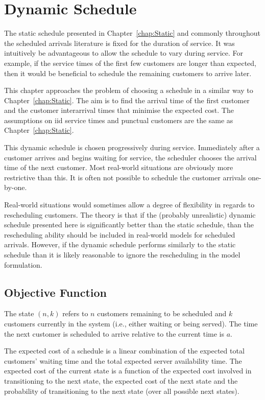 \chapter{Dynamic Schedule}
The static schedule presented in Chapter~\ref{chap:Static} and commonly throughout the scheduled arrivals literature is fixed for the duration of service. It was intuitively be advantageous to allow the schedule to vary during service. For example, if the service times of the first few customers are longer than expected, then it would be beneficial to schedule the remaining customers to arrive later.

This chapter approaches the problem of choosing a schedule in a similar way to Chapter~\ref{chap:Static}. The aim is to find the arrival time of the first customer and the customer interarrival times that minimise the expected cost. The assumptions on iid service times and punctual customers are the same as Chapter~\ref{chap:Static}.

This dynamic schedule is chosen progressively during service. Immediately after a customer arrives and begins waiting for service, the scheduler chooses the arrival time of the next customer. Most real-world situations are obviously more restrictive than this. It is often not possible to schedule the customer arrivals one-by-one.

Real-world situations would sometimes allow a degree of flexibility in regards to rescheduling customers. The theory is that if the (probably unrealistic) dynamic schedule presented here is significantly better than the static schedule, than the rescheduling ability should be included in real-world models for scheduled arrivals. However, if the dynamic schedule performs similarly to the static schedule than it is likely reasonable to ignore the rescheduling in the model formulation.

\section{Objective Function}
The state $(n, k)$ refers to $n$ customers remaining to be scheduled and $k$ customers currently in the system (i.e., either waiting or being served). The time the next customer is scheduled to arrive relative to the current time is $a$.

The expected cost of a schedule is a linear combination of the expected total customers' waiting time and the total expected server availability time. The expected cost of the current state is a function of the expected cost involved in transitioning to the next state, the expected cost of the next state and the probability of transitioning to the next state (over all possible next states).

